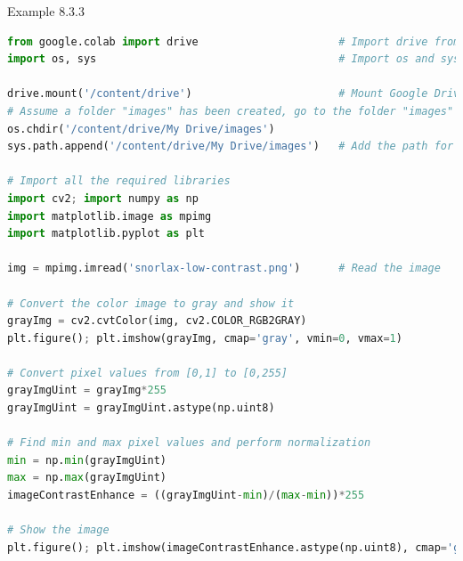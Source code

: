 \documentclass{book}
\begin{document}
\newpage
\begin{egBox}{Example 8.3.3}{}
    \begin{lstlisting}[language=Python, basicstyle=\ttfamily\small, keywordstyle=\color{blue}, commentstyle=\color{forestgreen}, stringstyle=\color{red}, showstringspaces=false]
from google.colab import drive                      # Import drive from google.colab package
import os, sys                                      # Import os and sys modules

drive.mount('/content/drive')                       # Mount Google Drive
# Assume a folder "images" has been created, go to the folder "images"
os.chdir('/content/drive/My Drive/images')
sys.path.append('/content/drive/My Drive/images')   # Add the path for interpreter to search

# Import all the required libraries
import cv2; import numpy as np
import matplotlib.image as mpimg
import matplotlib.pyplot as plt

img = mpimg.imread('snorlax-low-contrast.png')      # Read the image

# Convert the color image to gray and show it
grayImg = cv2.cvtColor(img, cv2.COLOR_RGB2GRAY)
plt.figure(); plt.imshow(grayImg, cmap='gray', vmin=0, vmax=1)

# Convert pixel values from [0,1] to [0,255]
grayImgUint = grayImg*255
grayImgUint = grayImgUint.astype(np.uint8)

# Find min and max pixel values and perform normalization
min = np.min(grayImgUint)
max = np.max(grayImgUint)
imageContrastEnhance = ((grayImgUint-min)/(max-min))*255

# Show the image
plt.figure(); plt.imshow(imageContrastEnhance.astype(np.uint8), cmap='gray', vmin=0, vmax=255)


\end{lstlisting}
\end{egBox}
\end{document}
